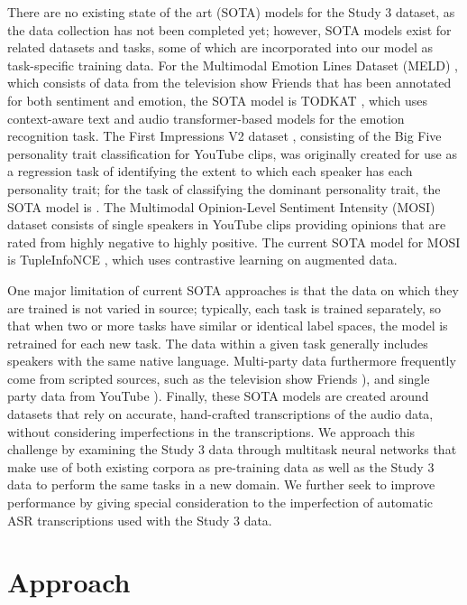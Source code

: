 \documentclass[11pt]{article}
\begin{document}
There are no existing state of the art (SOTA) models for the Study 3 dataset, as the
data collection has not been completed yet; however, SOTA models
exist for related datasets and tasks, some of which are incorporated into our
model as task-specific training data. For the Multimodal Emotion Lines Dataset (MELD)
\cite{Poria.ea:2019}, which consists of data from the television show Friends that
has been annotated for both sentiment and emotion, the
SOTA model is TODKAT \cite{Zhu.ea:2021}, which uses context-aware
text and audio transformer-based models for the emotion recognition task. The
First Impressions V2 dataset \cite{Ponce-Lopez.ea:2016}, consisting of the Big
Five personality trait classification for YouTube clips, was originally created
for use as a regression task of identifying the extent to which each speaker
has each personality trait; for the task of classifying the dominant personality
trait, the SOTA model is \citet{Culnan.ea:2021}. The Multimodal Opinion-Level
Sentiment Intensity (MOSI) dataset \cite{Zadeh.ea:2016} consists of single
speakers in YouTube clips providing opinions that are rated from highly
negative to highly positive. The current SOTA model for MOSI is
TupleInfoNCE \cite{Liu.ea:2021}, which uses contrastive learning on augmented
data.

One major limitation of current SOTA approaches is that the data on which they
are trained is not varied in source; typically, each task is trained
separately, so that when two or more tasks have similar or identical label
spaces, the model is retrained for each new task. The data within a given task
generally includes speakers with the same native language.  Multi-party data
furthermore frequently come from scripted sources, such as the television show
Friends \cite{Poria.ea:2019, Zhu.ea:2021}), and single party data from YouTube
\cite{Zadeh.ea:2016, Ponce-Lopez.ea:2016}). Finally, these SOTA models are
created around datasets that rely on accurate, hand-crafted transcriptions of
the audio data, without considering imperfections in the transcriptions. We
approach this challenge by examining the Study 3 data through multitask neural
networks that make use of both existing corpora as pre-training data as well as
the Study 3 data to perform the same tasks in a new domain. We further seek to
improve performance by giving special consideration to the imperfection of
automatic ASR transcriptions used with the Study 3 data.

\section{Approach}
\end{document}
